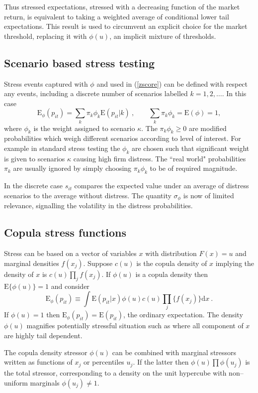 \documentclass[authoryear]{elsarticle}
\newcommand{\E}{\mathrm{E}}
\newcommand{\Es}{\E_\phi}
\newcommand{\de}{\mathrm{d}}
\newcommand{\eref}[1]{(\ref{#1})}
\newcommand{\cq}{\ , \qquad}
\newcommand{\be}[1]{\begin{equation}\label{#1}}
\newcommand{\ee}{\end{equation}}
\begin{document}
Thus stressed expectations, stressed with a decreasing function of the market return, is equivalent to taking a weighted average of conditional lower tail expectations.  This result is used to circumvent an explicit choice for the market threshold, replacing it with  $\phi(u)$, an implicit  mixture of thresholds. 

\subsection{Scenario based stress testing}
 Stress events captured with $\phi$ and used  in \eref{zscore}  can be defined with respect any events, including a discrete number of scenarios labelled $k=1,2, \ldots$.   In this case 
$$
\Es(p_{it})= \sum_k \pi_k\phi_k\E(p_{it}|k)\cq \sum_k\pi_k\phi_k = \E(\phi) = 1 ,
$$
where $\phi_k$ is the weight assigned to scenario $\kappa$.   The $\pi_k\phi_k\ge 0$ are  modified  probabilities which weigh different scenarios according to level of interest.   For example in standard stress testing the $\phi_k$ are chosen such that significant weight is given to scenarios $\kappa$ causing high  firm distress.   The ``real world" probabilities $\pi_k$ are  usually ignored by  simply choosing  $\pi_k\phi_k$ to be of  required magnitude. 

In the discrete case $s_{it}$ compares the expected value under an average of distress scenarios to the average without distress.  The quantity $\sigma_\phi$ is now of limited relevance, signalling the volatility in the distress probabilities.   


\subsection{Copula stress functions}


Stress can be based on a vector of variables $x$ with distribution $F(x)=u$ and marginal densities $f(x_j)$.    Suppose $c(u)$ is the copula density of $x$ implying the density of $x$ is $c(u)\prod_jf(x_j)$.    If   $\phi(u)$ is a copula density then $\E\{\phi(u)\}=1$ and
consider
\be{copula}
\Es(p_{it}) \equiv \int \E(p_{it}|x)\phi(u)c(u)\prod_j\{f(x_j)\}  \de x   \ .
\ee
If $\phi(u)=1$  then $\Es(p_{it})=\E(p_{it})$, the ordinary expectation.   The density $\phi(u)$ magnifies potentially stressful situation such as where all component of $x$ are highly  tail dependent.     

The copula density stressor $\phi(u)$  can be combined with marginal stressors written as functions of $x_j$ or  percentiles $u_j$.  If the latter then $\phi(u)\prod\phi(u_j)$ is the total stressor, corresponding to a density on the unit hypercube with non--uniform marginals  $\phi(u_j)\ne 1$. 
  
\end{document}
